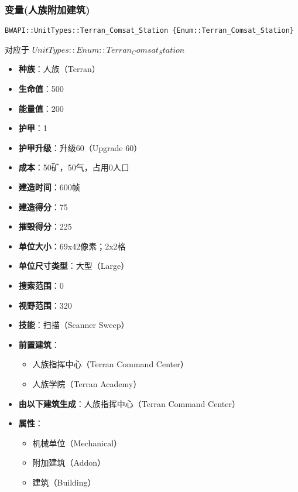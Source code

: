 \subsubsection{变量(人族附加建筑)}

\begin{tcolorbox}[colback=white, colframe=black!60!white, title=Terran\_Comsat\_Station(), arc=0mm]
    \begin{verbatim}
BWAPI::UnitTypes::Terran_Comsat_Station {Enum::Terran_Comsat_Station}
    \end{verbatim}
    对应于  $ UnitTypes::Enum::Terran_Comsat_Station $ 
    \begin{itemize}
        \item \textbf{种族}：人族（Terran）
        \item \textbf{生命值}：500
        \item \textbf{能量值}：200
        \item \textbf{护甲}：1
        \item \textbf{护甲升级}：升级60（Upgrade 60）
        \item \textbf{成本}：50矿，50气，占用0人口
        \item \textbf{建造时间}：600帧
        \item \textbf{建造得分}：75
        \item \textbf{摧毁得分}：225
        \item \textbf{单位大小}：69x42像素；2x2格
        \item \textbf{单位尺寸类型}：大型（Large）
        \item \textbf{搜索范围}：0
        \item \textbf{视野范围}：320
        \item \textbf{技能}：扫描（Scanner Sweep）
        \item \textbf{前置建筑}：
            \begin{itemize}
                \item 人族指挥中心（Terran Command Center）
                \item 人族学院（Terran Academy）
            \end{itemize}
        \item \textbf{由以下建筑生成}：人族指挥中心（Terran Command Center）
        \item \textbf{属性}：
            \begin{itemize}
                \item 机械单位（Mechanical）
                \item 附加建筑（Addon）
                \item 建筑（Building）
            \end{itemize}
    \end{itemize} 
\end{tcolorbox}

